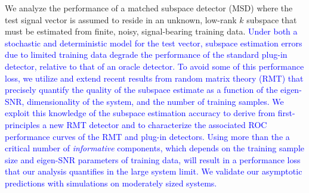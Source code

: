 We analyze the performance of a matched subspace detector (MSD) where the test signal vector is assumed to reside in an unknown, low-rank $k$ subspace that must be estimated from finite, noisy, signal-bearing training data. \textcolor{blue}{Under both a stochastic and deterministic model for the test vector, subspace estimation errors due to limited training data degrade the performance of the standard plug-in detector, relative to that of an oracle detector. To avoid some of this performance loss, we utilize and extend recent results from random matrix theory (RMT) that precisely quantify the quality of the subspace estimate as a function of the eigen-SNR, dimensionality of the system, and the number of training samples. We exploit this knowledge of the subspace estimation accuracy to derive from first-principles a new RMT detector and to characterize the associated ROC performance curves of the RMT and plug-in detectors. Using more than the a critical number of \textit{informative} components, which depends on the training sample size and eigen-SNR parameters of training data, will result in a performance loss that our analysis quantifies in the large system limit.  We validate our asymptotic predictions with simulations on moderately sized systems.}

